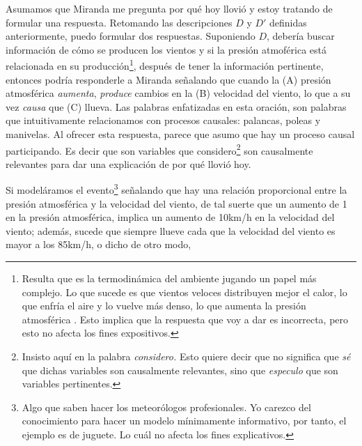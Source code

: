Asumamos que Miranda me pregunta por qué hoy llovió y estoy tratando de formular una respuesta. Retomando las descripciones $ D $ y $ D' $ definidas anteriormente, puedo formular dos respuestas. Suponiendo $ D $, debería buscar información de cómo se producen los vientos y si la presión atmoférica está relacionada en su producción\footnote{
	Resulta que es la termodinámica del ambiente jugando un papel más complejo. Lo que sucede es que vientos veloces distribuyen mejor el calor, lo que enfría el aire y lo vuelve más denso, lo que aumenta la presión atmosférica \parencite{Spiridonov2021}. Esto implica que la respuesta que voy a dar es incorrecta, pero esto no afecta los fines expositivos.
},
después de tener la información pertinente, entonces podría responderle a Miranda señalando que cuando la (A) presión atmosférica \emph{aumenta}, \emph{produce} cambios en la (B) velocidad del
viento, lo que a su vez \emph{causa} que (C) llueva. Las palabras enfatizadas en esta oración, son palabras que intuitivamente relacionamos con procesos causales: palancas, poleas y manivelas. Al ofrecer esta respuesta, parece que asumo que hay un proceso causal participando. Es decir que son variables que considero\footnote{
    Insisto aquí en la palabra \emph{considero.} Esto quiere decir que no significa que \emph{sé} que dichas variables son causalmente relevantes, sino que \emph{especulo} que son variables pertinentes.
}
son causalmente relevantes para dar una explicación de por qué llovió hoy.

Si modeláramos el evento\footnote{
	Algo que saben hacer los meteorólogos profesionales. Yo carezco del conocimiento para hacer un modelo  mínimamente informativo, por tanto, el ejemplo es de juguete. Lo cuál  no afecta los fines explicativos.
}
señalando que hay una relación proporcional entre la presión atmosférica y la velocidad del viento, de tal suerte que un aumento de 1 en la presión atmosférica, implica un aumento de 10km/h en la velocidad del viento; además, sucede que siempre llueve cada que la velocidad del viento es mayor a  los 85km/h, o dicho de otro modo, 

